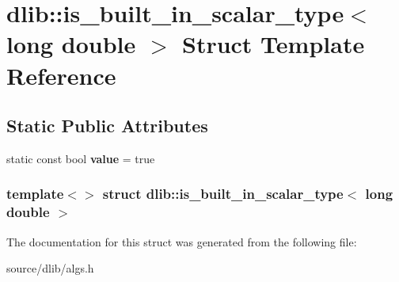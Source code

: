 \hypertarget{structdlib_1_1is__built__in__scalar__type_3_01long_01double_01_4}{
\section{dlib::is\_\-built\_\-in\_\-scalar\_\-type$<$ long double $>$ Struct Template Reference}
\label{structdlib_1_1is__built__in__scalar__type_3_01long_01double_01_4}
}
\subsection*{Static Public Attributes}
\begin{DoxyCompactItemize}
\item 
\hypertarget{structdlib_1_1is__built__in__scalar__type_3_01long_01double_01_4_a8fd91a93b141f0ce4b27ce2a3e97bb0c}{
static const bool {\bfseries value} = true}
\label{structdlib_1_1is__built__in__scalar__type_3_01long_01double_01_4_a8fd91a93b141f0ce4b27ce2a3e97bb0c}

\end{DoxyCompactItemize}
\subsubsection*{template$<$$>$ struct dlib::is\_\-built\_\-in\_\-scalar\_\-type$<$ long double $>$}



The documentation for this struct was generated from the following file:\begin{DoxyCompactItemize}
\item 
source/dlib/algs.h\end{DoxyCompactItemize}

